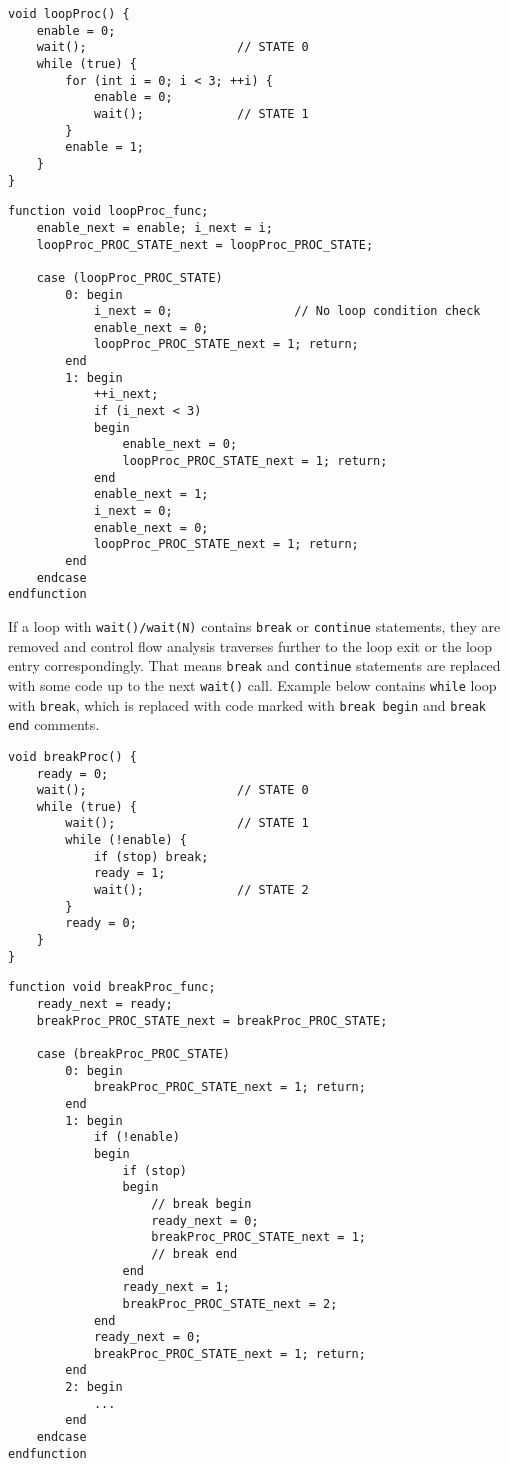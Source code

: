 \begin{lstlisting}[style=mycpp]
void loopProc() {
    enable = 0;
    wait();                     // STATE 0
    while (true) {
        for (int i = 0; i < 3; ++i) {
            enable = 0;
            wait();             // STATE 1
        }
        enable = 1;
    }
} 
\end{lstlisting}
%
\begin{lstlisting}[style=myverilog]
function void loopProc_func;
    enable_next = enable; i_next = i;
    loopProc_PROC_STATE_next = loopProc_PROC_STATE;
    
    case (loopProc_PROC_STATE)
        0: begin
            i_next = 0;					// No loop condition check
            enable_next = 0;
            loopProc_PROC_STATE_next = 1; return; 
        end
        1: begin
            ++i_next;
            if (i_next < 3)
            begin
                enable_next = 0;
                loopProc_PROC_STATE_next = 1; return; 
            end
            enable_next = 1;
            i_next = 0;
            enable_next = 0;
            loopProc_PROC_STATE_next = 1; return;   
        end
    endcase
endfunction
\end{lstlisting}

If a loop with {\tt wait()/wait(N)} contains {\tt break} or {\tt continue} statements, they are removed and control flow analysis traverses further to the loop exit or the loop entry correspondingly. That means {\tt break} and {\tt continue} statements are replaced with some code up to the next {\tt wait()} call. Example below contains {\tt while} loop with {\tt break}, which is replaced with code marked with {\tt break begin} and {\tt break end} comments.

\begin{lstlisting}[style=mycpp]
void breakProc() {
    ready = 0;
    wait();                     // STATE 0
    while (true) {
        wait();                 // STATE 1
        while (!enable) {
            if (stop) break;
            ready = 1;
            wait();             // STATE 2
        }
        ready = 0;
    }
}    
\end{lstlisting}

\begin{lstlisting}[style=myverilog]
function void breakProc_func;
    ready_next = ready;
    breakProc_PROC_STATE_next = breakProc_PROC_STATE;
    
    case (breakProc_PROC_STATE)
        0: begin
            breakProc_PROC_STATE_next = 1; return;   
        end
        1: begin
            if (!enable)
            begin
                if (stop)
                begin
                    // break begin
                    ready_next = 0;
                    breakProc_PROC_STATE_next = 1;
                    // break end
                end
                ready_next = 1;
                breakProc_PROC_STATE_next = 2; 
            end
            ready_next = 0;
            breakProc_PROC_STATE_next = 1; return;
        end
        2: begin
            ...
        end
    endcase
endfunction
\end{lstlisting}


